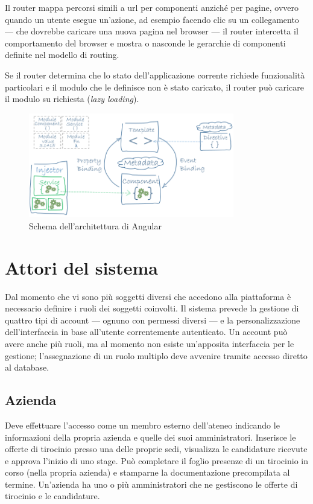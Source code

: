 Il router mappa percorsi simili a \acrshort{url} per componenti anziché per pagine, ovvero quando un utente esegue un'azione, ad esempio facendo clic su un collegamento --- che dovrebbe caricare una nuova pagina nel browser --- il router intercetta il comportamento del browser e mostra o nasconde le gerarchie di componenti definite nel modello di routing.

Se il router determina che lo stato dell'applicazione corrente richiede funzionalità particolari e il modulo che le definisce non è stato caricato, il router può caricare il modulo su richiesta (\textit{lazy loading}).

\begin{figure}[!h] 
	\centering    
	\includegraphics[width=0.8\textwidth]{Chapter1/Figs/angular-overview}
	\caption[Architettura di Angular]{Schema dell'architettura di Angular\cite{angularoverview}}
	\label{fig:angular-overview}
\end{figure}

\section{Attori del sistema}

Dal momento che vi sono più soggetti diversi che accedono alla piattaforma è necessario definire i ruoli dei soggetti coinvolti. Il sistema prevede la gestione di quattro tipi di account --- ognuno con permessi diversi --- e la personalizzazione dell'interfaccia in base all'utente correntemente autenticato. Un account può avere anche più ruoli, ma al momento non esiste un'apposita interfaccia per le gestione; l'assegnazione di un ruolo multiplo deve avvenire tramite accesso diretto al database.

\subsection{Azienda}
Deve effettuare l'accesso come un membro esterno dell'ateneo indicando le informazioni della propria azienda e quelle dei suoi amministratori. Inserisce le offerte di tirocinio presso una delle proprie sedi, visualizza le candidature ricevute e approva l'inizio di uno stage. Può completare il foglio presenze di un tirocinio in corso (nella propria azienda) e stamparne la documentazione precompilata al termine. Un'azienda ha uno o più amministratori che ne gestiscono le offerte di tirocinio e le candidature.

